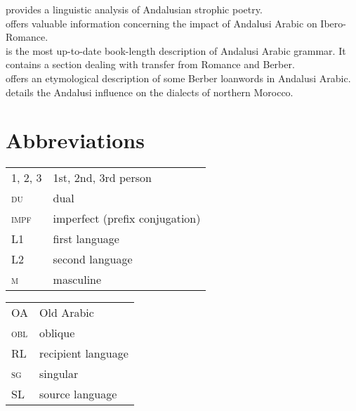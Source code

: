 \documentclass[output=paper,modfonts,nonflat]{langsci/langscibook}
\begin{document}
\citet{Corriente1997poetry} provides a linguistic analysis of Andalusian strophic poetry.\\
\citet{Corriente2005} offers valuable information concerning the impact of Andalusi Arabic on Ibero-Romance.\\
\citet{CorrientePereiraVicente2015} is the most up-to-date book-length description of Andalusi Arabic grammar. It contains a section dealing with transfer from Romance and Berber.\\ 
\citet{Ferrando1997} offers an etymological description of some Berber loanwords in Andalusi Arabic.\\ 
\citet{Vicente2010} details the Andalusi influence on the dialects of northern Morocco. 

\section*{Abbreviations}

\begin{tabularx}{.5\textwidth}{@{}lQ@{}}
\textsc{1, 2, 3} & 1st, 2nd, 3rd person \\
\textsc{du} & dual \\
\textsc{impf} & imperfect (prefix conjugation) \\
L1 & first language \\
L2 & second language \\
\textsc{m} & masculine \\
\end{tabularx}%
\begin{tabularx}{.5\textwidth}{@{}lQ@{}}
OA & Old Arabic \\
\textsc{obl} & oblique \\
RL & recipient language \\
\textsc{sg} & singular \\
SL & source language \\
\end{tabularx}

\sloppy\printbibliography[heading=subbibliography,notkeyword=this]
\end{document}

